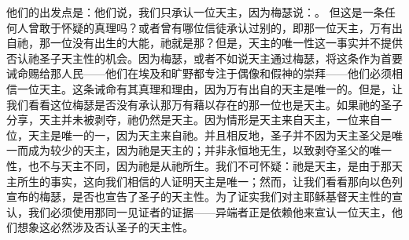 他们的出发点是：他们说，我们只承认一位天主，因为梅瑟说：。 但这是一条任何人曾敢于怀疑的真理吗？或者曾有哪位信徒承认过别的，即那一位天主，万有出自祂，那一位没有出生的大能，祂就是那？但是，天主的唯一性这一事实并不提供否认祂圣子天主性的机会。因为梅瑟，或者不如说天主通过梅瑟，将这条作为首要诫命赐给那人民——他们在埃及和旷野都专注于偶像和假神的崇拜——他们必须相信一位天主。这条诫命有其真理和理由，因为万有出自的天主是唯一的。但是，让我们看看这位梅瑟是否没有承认那万有藉以存在的那一位也是天主。如果祂的圣子分享，天主并未被剥夺，祂仍然是天主。因为情形是天主来自天主，一位来自一位，天主是唯一的一，因为天主来自祂。并且相反地，圣子并不因为天主圣父是唯一而成为较少的天主，因为祂是天主的；并非永恒地无生，以致剥夺圣父的唯一性，也不与天主不同，因为祂是从祂所生。我们不可怀疑：祂是天主，是由于那天主所生的事实，这向我们相信的人证明天主是唯一；然而，让我们看看那向以色列宣布的梅瑟，是否也宣告了圣子的天主性。为了证实我们对主耶稣基督天主性的宣认，我们必须使用那同一见证者的证据——异端者正是依赖他来宣认一位天主，他们想象这必然涉及否认圣子的天主性。\par

